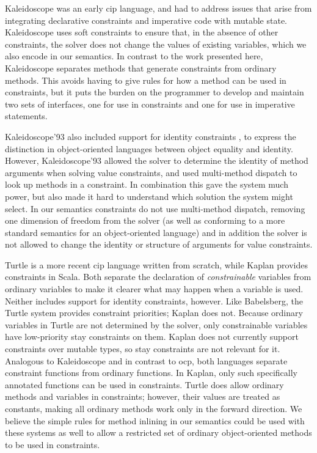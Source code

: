 \documentclass[10pt,reprint]{sigplanconf-preprint}
\newcommand{\ac}[1]{\gls*{#1}}
\begin{document}
Kaleidoscope \cite{freeman-benson-ecoop-1992,lopez1994kaleidoscope}
was an early \ac{cip}
language, and had to address issues that arise from integrating
declarative constraints and imperative code with mutable state.
Kaleidoscope uses soft constraints to ensure that, in the absence of
other constraints, the solver does not change the values of existing
variables, which we also encode in our semantics. In contrast to the
work presented here, Kaleidoscope separates methods that generate
constraints from ordinary methods.  This avoids having to give rules
for how a method can be used in constraints, but it puts the burden on
the programmer to develop and maintain two sets of interfaces, one for
use in constraints and one for use in imperative statements.

Kaleidoscope'93 also included support for identity constraints
\cite{lopez1994kaleidoscope}, to express the distinction in
object-oriented languages between object equality and
identity. However, Kaleidoscope'93 allowed the solver to determine the
identity of method arguments when solving value constraints, and used
multi-method dispatch to look up methods in a constraint.  In
combination this gave the system much power, but also made it hard to
understand which solution the system might select.  In our semantics
constraints do not use multi-method dispatch, removing one dimension
of freedom from the solver (as well as conforming to a more standard
semantics for an object-oriented language) and in addition the solver
is not allowed to change the identity or structure of arguments for
value constraints.

Turtle \cite{grabmuller2004turtle} is a more recent \ac{cip} language
written from scratch, while Kaplan \cite{koksal2012constraints}
provides constraints in Scala. Both separate the declaration of
\mbox{\emph{constrainable}} variables from ordinary variables to make
it clearer what may happen when a variable is used.  Neither includes
support for identity constraints, however.  Like Babelsberg, the
Turtle system provides constraint priorities; Kaplan does not. Because
ordinary variables in Turtle are not determined by the solver, only
constrainable variables have low-priority stay constraints on
them. Kaplan does not currently support constraints over mutable
types, so stay constraints are not relevant for it.  Analogous to
Kaleidoscope and in contrast to \ac{ocp}, both languages separate
constraint functions from ordinary functions. In Kaplan, only such
specifically annotated functions can be used in constraints. Turtle
does allow ordinary methods and variables in constraints; however,
their values are treated as constants, making all ordinary methods
work only in the forward direction. We believe the simple rules for
method inlining in our semantics could be used with these systems as
well to allow a restricted set of ordinary object-oriented methods to
be used in constraints.
\end{document}
